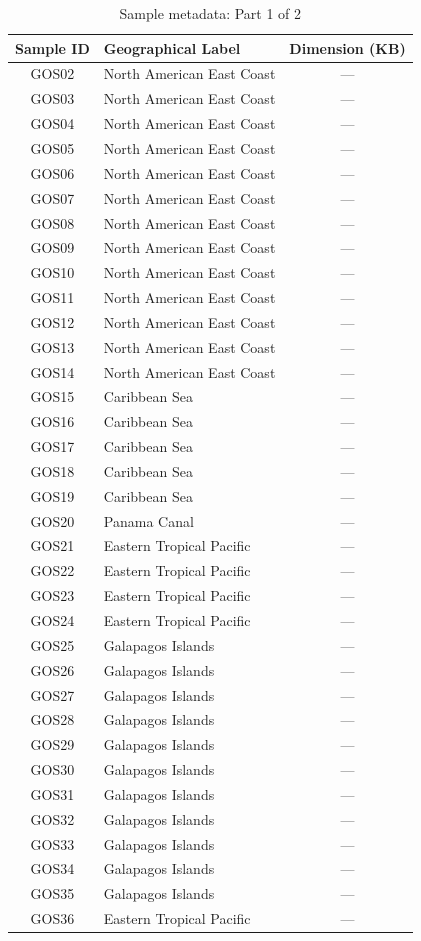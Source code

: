 \begin{table}[ht]
\centering
\begin{tabular}{|c|l|c|}
\hline
\textbf{Sample ID} & \textbf{Geographical Label} & \textbf{Dimension (KB)} \\
\hline
GOS02 & North American East Coast & --- \\
GOS03 & North American East Coast & --- \\
GOS04 & North American East Coast & --- \\
GOS05 & North American East Coast & --- \\
GOS06 & North American East Coast & --- \\
GOS07 & North American East Coast & --- \\
GOS08 & North American East Coast & --- \\
GOS09 & North American East Coast & --- \\
GOS10 & North American East Coast & --- \\
GOS11 & North American East Coast & --- \\
GOS12 & North American East Coast & --- \\
GOS13 & North American East Coast & --- \\
GOS14 & North American East Coast & --- \\
GOS15 & Caribbean Sea             & --- \\
GOS16 & Caribbean Sea             & --- \\
GOS17 & Caribbean Sea             & --- \\
GOS18 & Caribbean Sea             & --- \\
GOS19 & Caribbean Sea             & --- \\
GOS20 & Panama Canal              & --- \\
GOS21 & Eastern Tropical Pacific  & --- \\
GOS22 & Eastern Tropical Pacific  & --- \\
GOS23 & Eastern Tropical Pacific  & --- \\
GOS24 & Eastern Tropical Pacific  & --- \\
GOS25 & Galapagos Islands         & --- \\
GOS26 & Galapagos Islands         & --- \\
GOS27 & Galapagos Islands         & --- \\
GOS28 & Galapagos Islands         & --- \\
GOS29 & Galapagos Islands         & --- \\
GOS30 & Galapagos Islands         & --- \\
GOS31 & Galapagos Islands         & --- \\
GOS32 & Galapagos Islands         & --- \\
GOS33 & Galapagos Islands         & --- \\
GOS34 & Galapagos Islands         & --- \\
GOS35 & Galapagos Islands         & --- \\
GOS36 & Eastern Tropical Pacific  & --- \\
\hline
\end{tabular}
\caption{Sample metadata: Part 1 of 2}
\label{tab:samples_part1}
\end{table}
